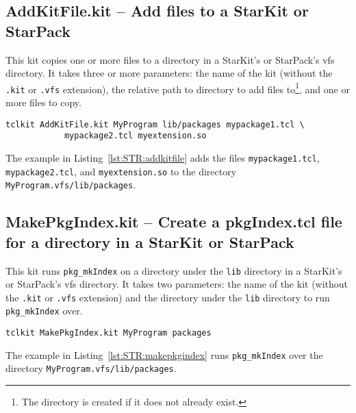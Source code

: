 \subsection{AddKitFile.kit -- Add files to a StarKit or StarPack}

This kit copies one or more files to a directory in
a StarKit's or StarPack's vfs directory. It takes three or more
parameters: the name of the kit (without the \lstinline=.kit= or
\lstinline=.vfs= extension), the relative path to directory to add files
to\footnote{The directory is created if it does not already exist.}, and
one or more files to copy.

\begin{lstlisting}[label={lst:STR:addkitfile},caption={Adding files to a
 kit.}]
tclkit AddKitFile.kit MyProgram lib/packages mypackage1.tcl \
			mypackage2.tcl myextension.so 
\end{lstlisting}

The example in Listing~\ref{lst:STR:addkitfile} adds the files
\lstinline=mypackage1.tcl=, \lstinline=mypackage2.tcl=, and
\lstinline=myextension.so= to the directory
\lstinline=MyProgram.vfs/lib/packages=. 

\subsection{MakePkgIndex.kit -- Create a pkgIndex.tcl file for a
directory in a StarKit or StarPack}

This kit runs \lstinline=pkg_mkIndex= on a directory under the
\lstinline=lib= directory in a StarKit's or StarPack's vfs directory. It
takes two parameters: the name of the kit (without the \lstinline=.kit=
or \lstinline=.vfs= extension) and the directory under the
\lstinline=lib= directory to run \lstinline=pkg_mkIndex= over.

\begin{lstlisting}[label={lst:STR:makepkgindex},caption={Creating the
pkgIndex.tcl for a directory of packages in a kit.}]
tclkit MakePkgIndex.kit MyProgram packages
\end{lstlisting}

The example in Listing~\ref{lst:STR:makepkgindex} runs 
\lstinline=pkg_mkIndex= over the directory
\lstinline=MyProgram.vfs/lib/packages=. 


